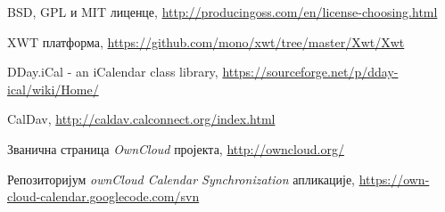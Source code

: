 %
%
\begin{thebibliography}{11}
 {BSD, GPL и MIT лиценце, \url{http://producingoss.com/en/license-choosing.html}}

 {XWT платформа, \url{https://github.com/mono/xwt/tree/master/Xwt/Xwt}}

 {DDay.iCal - an iCalendar class library, \url{https://sourceforge.net/p/dday-ical/wiki/Home/}}

 {CalDav, \url{http://caldav.calconnect.org/index.html}}

 {Званична страница {\it OwnCloud} пројекта, \url{http://owncloud.org/}}

 {Репозиторијум {\it ownCloud Calendar Synchronization} апликације, \url{https://own-cloud-calendar.googlecode.com/svn}}

\end{thebibliography}

